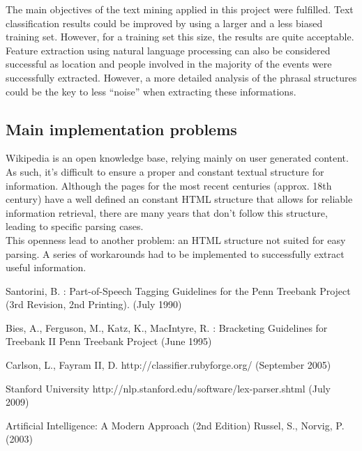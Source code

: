 \documentclass{llncs}
\begin{document}
The main objectives of the text mining applied in this project were fulfilled. Text classification results could be improved by using a larger and a less biased training set. However, for a training set this size, the results are quite acceptable. Feature extraction using natural language processing can also be considered successful as location and people involved in the majority of the events were successfully extracted. However, a more detailed analysis of the phrasal structures could be the key to less ``noise'' when extracting these informations.

\subsection{Main implementation problems}

Wikipedia is an open knowledge base, relying mainly on user generated content. As such, it's difficult to ensure a proper and constant textual structure for information. Although the pages for the most recent centuries (approx. 18th century) have a well defined an constant HTML structure that allows for reliable information retrieval, there are many years that don't follow this structure, leading to specific parsing cases.\\

This openness lead to another problem: an HTML structure not suited for easy parsing. A series of workarounds had to be implemented to successfully extract useful information.

\newpage
%
%
\begin{thebibliography}{}
%
Santorini, B. :
Part-of-Speech Tagging Guidelines for the
Penn Treebank Project (3rd Revision, 2nd Printing).
(July 1990)

Bies, A., Ferguson, M., Katz, K., MacIntyre, R. :
Bracketing Guidelines for Treebank II
Penn Treebank Project
(June 1995)

Carlson, L., Fayram II, D.
http://classifier.rubyforge.org/
(September 2005)

Stanford University
http://nlp.stanford.edu/software/lex-parser.shtml
(July 2009)

Artificial Intelligence: A Modern Approach (2nd Edition)
Russel, S., Norvig, P.
(2003)

\end{thebibliography}
\end{document}
